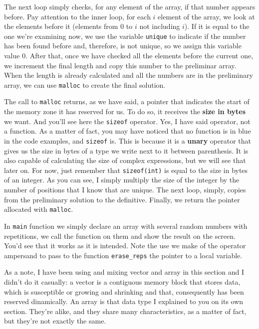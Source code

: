 \documentclass[a4paper]{article}
\begin{document}
The next loop simply checks, for any element of the array, if that number
appears before. Pay attention to the inner loop, for each $i$ element of the
array, we look at the elements before it (elements from 0 to $i$ not including
$i$). If it is equal to the one we're examining now,
we use the variable \verb!unique! to indicate if the number has
been found before and, therefore, is not unique, so we assign this variable
value 0. After that, once we have checked all the elements before the current
one, we increment the final length and copy this number to the preliminar array.
When the length is already calculated and all the numbers are in the preliminary
array, we can use \verb!malloc! to create the final solution.

The call to \verb!malloc! returns, as we have said, a pointer that indicates
the start of the memory zone it has reserved for us.
To do so, it receives the \textbf{size in bytes}
we want. And you'll see here the \lstinline[style=C]{sizeof} operator.
Yes, I have said operator, not a function. As a matter of fact, you may have
noticed that no function is in blue in the code examples, and \verb!sizeof!
is. This is because it is a \textbf{unary} operator that gives us the size in
bytes of a type we write next to it between parenthesis. It is also capable of
calculating the size of complex expressions, but we will see that later on.
For now, just remember that \verb!sizeof(int)! is equal to the size in bytes of
an integer. As you can see, I simply multiply the size of the integer by the
number of positions that I know that are unique. The next loop, simply, copies
from the preliminary solution to the definitive. Finally, we return the pointer
allocated with \verb!malloc!.

In \verb!main! function we simply declare an array with several random numbers
with repetitions, we call the function on them and show the result on the
screen. You'd see that it works as it is intended. Note the use we make of the
operator ampersand to pass to the function \verb!erase_reps! the pointer to
a local variable.

As a note, I have been using and mixing vector and array in this section and
I didn't do it casually: a vector is a contiguous memory block that stores data,
which is susceptible or growing and shrinking and that, consequently has been
reserved dinamically. An array is that data type I explained to you on its own
section. They're alike, and they share many characteristics, as a matter of
fact, but they're not exactly the same.
\end{document}
